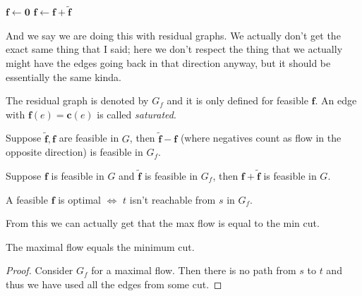 \begin{algorithm}
\caption{Second try at algo}\label{alg:second}
\begin{algorithmic}
\State $\mathbf{f} \gets \mathbf{0}$
    \State $\mathbf{f} \gets \mathbf{f} + \tilde{\mathbf{f}}$
\EndWhile
\end{algorithmic}
\end{algorithm}

And we say we are doing this with residual graphs. We actually don't get the exact same thing that I said; here we don't respect the thing that we actually might have the edges going back in that direction anyway, but it should be essentially the same kinda.

The residual graph is denoted by $G_f$ and it is only defined for feasible $\mathbf{f}$. An edge with $\mathbf{f}(e) = \mathbf{c}(e)$ is called \emph{saturated}. 

\begin{lema}
    Suppose $\tilde{\mathbf{f}}, \mathbf{f}$ are feasible in $G$, then $\tilde{\mathbf{f}} - \mathbf{f}$ (where negatives count as flow in the opposite direction) is feasible in $G_f$.
\end{lema}

\obvs

\begin{lema}
    Suppose $\mathbf{f}$ is feasible in $G$ and $\tilde{\mathbf{f}}$ is feasible in $G_f$, then $\mathbf{f} + \tilde{\mathbf{f}}$ is feasible in $G$.
\end{lema}

\obvs

\begin{lema}
    A feasible $\mathbf{f}$ is optimal $\iff$ $t$ isn't reachable from $s$ in $G_f$.
\end{lema}

\obvs

From this we can actually get that the max flow is equal to the min cut.

\begin{izrek}[Max Flow = Min Cut]
    The maximal flow equals the minimum cut.
\end{izrek}

\begin{proof}
    Consider $G_f$ for a maximal flow. Then there is no path from $s$ to $t$ and thus we have used all the edges from some cut.
\end{proof}


